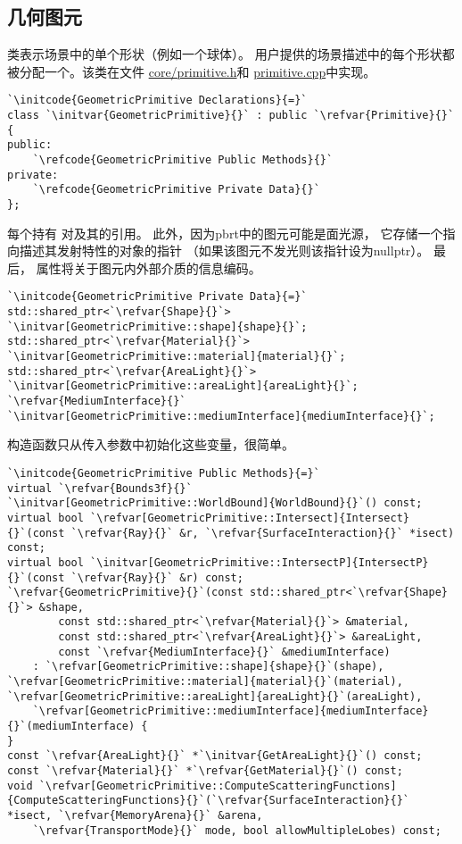 \subsection{几何图元}\label{sub:几何图元}
类表示场景中的单个形状（例如一个球体）。
用户提供的场景描述中的每个形状都被分配一个。该类在文件
\href{https://github.com/mmp/pbrt-v3/tree/master/src/core/primitive.h}{\ttfamily core/primitive.h}和
\href{https://github.com/mmp/pbrt-v3/tree/master/src/core/primitive.cpp}{\ttfamily primitive.cpp}中实现。
\begin{lstlisting}
`\initcode{GeometricPrimitive Declarations}{=}`
class `\initvar{GeometricPrimitive}{}` : public `\refvar{Primitive}{}` {
public:
    `\refcode{GeometricPrimitive Public Methods}{}`
private:
    `\refcode{GeometricPrimitive Private Data}{}`
};
\end{lstlisting}

每个持有
对及其的引用。
此外，因为pbrt中的图元可能是面光源，
它存储一个指向描述其发射特性的对象的指针
（如果该图元不发光则该指针设为{\ttfamily nullptr}）。
最后，
属性将关于图元内外部介质的信息编码。
\begin{lstlisting}
`\initcode{GeometricPrimitive Private Data}{=}`
std::shared_ptr<`\refvar{Shape}{}`> `\initvar[GeometricPrimitive::shape]{shape}{}`;
std::shared_ptr<`\refvar{Material}{}`> `\initvar[GeometricPrimitive::material]{material}{}`;
std::shared_ptr<`\refvar{AreaLight}{}`> `\initvar[GeometricPrimitive::areaLight]{areaLight}{}`;
`\refvar{MediumInterface}{}` `\initvar[GeometricPrimitive::mediumInterface]{mediumInterface}{}`;
\end{lstlisting}

构造函数只从传入参数中初始化这些变量，很简单。
\begin{lstlisting}
`\initcode{GeometricPrimitive Public Methods}{=}`
virtual `\refvar{Bounds3f}{}` `\initvar[GeometricPrimitive::WorldBound]{WorldBound}{}`() const;
virtual bool `\refvar[GeometricPrimitive::Intersect]{Intersect}{}`(const `\refvar{Ray}{}` &r, `\refvar{SurfaceInteraction}{}` *isect) const;
virtual bool `\initvar[GeometricPrimitive::IntersectP]{IntersectP}{}`(const `\refvar{Ray}{}` &r) const;
`\refvar{GeometricPrimitive}{}`(const std::shared_ptr<`\refvar{Shape}{}`> &shape,
        const std::shared_ptr<`\refvar{Material}{}`> &material,
        const std::shared_ptr<`\refvar{AreaLight}{}`> &areaLight,
        const `\refvar{MediumInterface}{}` &mediumInterface)
    : `\refvar[GeometricPrimitive::shape]{shape}{}`(shape), `\refvar[GeometricPrimitive::material]{material}{}`(material), `\refvar[GeometricPrimitive::areaLight]{areaLight}{}`(areaLight),
    `\refvar[GeometricPrimitive::mediumInterface]{mediumInterface}{}`(mediumInterface) {
}
const `\refvar{AreaLight}{}` *`\initvar{GetAreaLight}{}`() const;
const `\refvar{Material}{}` *`\refvar{GetMaterial}{}`() const;
void `\refvar[GeometricPrimitive::ComputeScatteringFunctions]{ComputeScatteringFunctions}{}`(`\refvar{SurfaceInteraction}{}` *isect, `\refvar{MemoryArena}{}` &arena,
    `\refvar{TransportMode}{}` mode, bool allowMultipleLobes) const;
\end{lstlisting}

